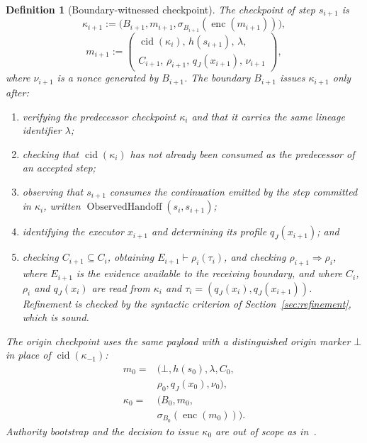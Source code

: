 \documentclass[10pt,twocolumn]{article}
\newtheorem{definition}{Definition}
\begin{document}
\begin{definition}[Boundary-witnessed checkpoint]
The checkpoint of step \(s_{i+1}\) is
\[
\kappa_{i+1}
:=
\bigl(
B_{i+1},m_{i+1},
\sigma_{B_{i+1}}(\operatorname{enc}(m_{i+1}))
\bigr),
\]
\[
m_{i+1}
:=
\left(
\begin{gathered}
\operatorname{cid}(\kappa_i),\,h(s_{i+1}),\,\lambda,\\
C_{i+1},\,\rho_{i+1},\,q_J(x_{i+1}),\,\nu_{i+1}
\end{gathered}
\right),
\]
where \(\nu_{i+1}\) is a nonce generated by \(B_{i+1}\). The boundary
\(B_{i+1}\) issues \(\kappa_{i+1}\) only after:
\begin{enumerate}
    \item verifying the predecessor checkpoint \(\kappa_i\) and that it carries
    the same lineage identifier \(\lambda\);
    \item checking that \(\operatorname{cid}(\kappa_i)\) has not already been
    consumed as the predecessor of an accepted step;
    \item observing that \(s_{i+1}\) consumes the continuation emitted by the
    step committed in \(\kappa_i\), written
    \(\operatorname{ObservedHandoff}(s_i,s_{i+1})\);
    \item identifying the executor \(x_{i+1}\) and determining its profile
    \(q_J(x_{i+1})\); and
    \item checking \(C_{i+1}\subseteq C_i\), obtaining
    \(E_{i+1}\vdash\rho_i(\tau_i)\), and checking
    \(\rho_{i+1}\Rightarrow\rho_i\), where \(E_{i+1}\) is the evidence
    available to the receiving boundary, and where \(C_i\), \(\rho_i\) and
    \(q_J(x_i)\) are read from \(\kappa_i\) and
    \(\tau_i=(q_J(x_i),q_J(x_{i+1}))\). Refinement is checked by the syntactic
    criterion of Section~\ref{sec:refinement}, which is sound.
\end{enumerate}
The origin checkpoint uses the same payload with a distinguished origin marker
\(\bot\) in place of \(\operatorname{cid}(\kappa_{-1})\):
\[
\begin{aligned}
m_0={}&(\bot,h(s_0),\lambda,C_0,\\
&\rho_0,q_J(x_0),\nu_0),\\
\kappa_0={}&\bigl(B_0,m_0,\\
&\sigma_{B_0}(\operatorname{enc}(m_0))\bigr).
\end{aligned}
\]
Authority bootstrap and the decision to issue \(\kappa_0\) are out of scope as
in~\cite{gallo2026poc}.
\end{definition}
\end{document}
